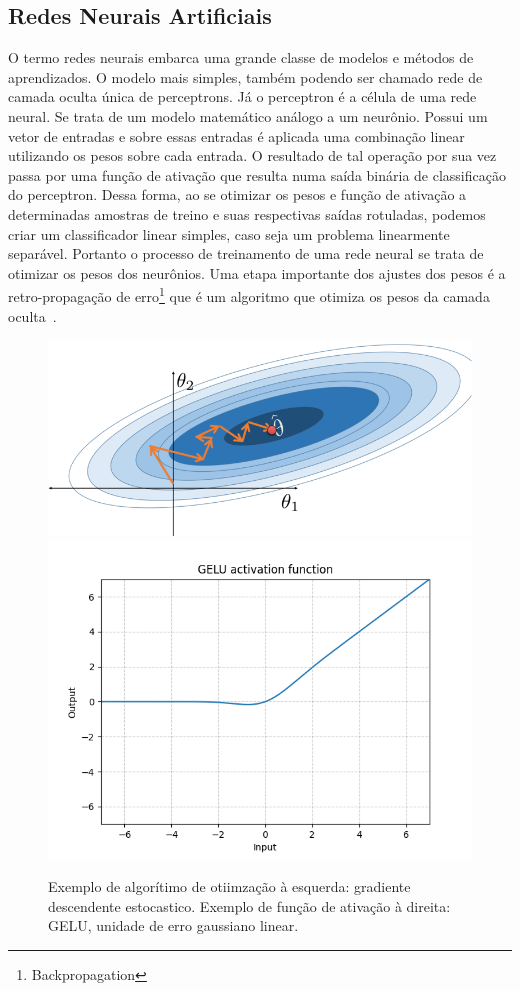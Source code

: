 \subsection{Redes Neurais Artificiais}\label{sec:Cap2_redes_neurais}

O termo redes neurais embarca uma grande classe de modelos e métodos de aprendizados. O modelo mais simples, também podendo ser chamado rede de camada oculta única de perceptrons. Já o  perceptron é a célula de uma rede neural. Se trata de um modelo matemático análogo a um neurônio. Possui um vetor de entradas e sobre essas entradas é aplicada uma combinação linear utilizando os pesos sobre cada entrada. O resultado de tal operação por sua vez passa por uma função de ativação que resulta numa saída binária de classificação do perceptron. Dessa forma, ao se otimizar os pesos e função de ativação a determinadas amostras de treino e suas respectivas saídas rotuladas, podemos criar um classificador linear simples, caso seja um problema linearmente separável. Portanto o processo de treinamento de uma rede neural se trata de otimizar os pesos dos neurônios. Uma etapa importante dos ajustes dos pesos é a retro-propagação de erro\footnote{Backpropagation} que é um algoritmo que otimiza os pesos da camada oculta~\cite{hastie01statisticallearning}.

\begin{figure}[!ht]
    \centering
    \includegraphics[width=0.45\columnwidth]{
        Imagens/stochastic_gradient_descent.PNG
    }
    \includegraphics[width=0.45\columnwidth]{
        Imagens/GELU.PNG
    }
    \caption{Exemplo de algorítimo de otiimzação à esquerda: gradiente descendente estocastico. Exemplo de função de ativação à direita: GELU, unidade de erro gaussiano linear.}
    \label{fig:SGD_GELU}
\end{figure}


